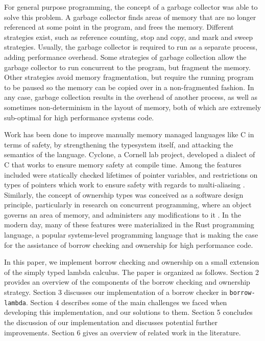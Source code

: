 \documentclass[letterpaper,11pt]{article}
\begin{document}
For general purpose programming, the concept of a garbage collector was able to solve
this problem. A garbage collector finds areas of memory that are no longer referenced
at some point in the program, and frees the memory. Different strategies exist, such
as reference counting, stop and copy, and mark and sweep strategies. Usually, the
garbage collector is required to run as a separate process, adding performance
overhead. Some strategies of garbage collection allow the garbage collector to run
concurrent to the program, but fragment the memory. Other strategies avoid memory
fragmentation, but require the running program to be paused so the memory can be
copied over in a non-fragmented fashion. In any case, garbage collection results
in the overhead of another process, as well as sometimes non-determinism in the layout
of memory, both of which are extremely sub-optimal for high performance systems code.

Work has been done to improve manually memory managed languages like C in terms of
safety, by strengthening the typesystem itself, and attacking the semantics of the
language. Cyclone, a Cornell lab project, developed a dialect of C that works to
ensure memory safety at compile time. Among the features included were statically
checked lifetimes of pointer variables, and restrictions on types of pointers which
work to ensure safety with regards to multi-aliasing \cite{grossman2002region}. Similarly, the
concept of ownership types was conceived as a software design principle, particularly
in research on concurrent programming, where an object governs an area of memory,
and administers any modifications to it \cite{boyapati2002ownership} \cite{gordon2012uniqueness}. In the modern day,
many of these features were materialized in the Rust programming language, a popular
systems-level programming language that is making the case for the assistance of
borrow checking and ownership for high performance code.

In this paper, we implement borrow checking and ownership on a small extension of the
simply typed lambda calculus. The paper is organized as follows. Section 2 provides an
overview of the components of the borrow checking and ownership strategy. Section 3
discusses our implementation of a borrow checker in \texttt{borrow-lambda}.
Section 4 describes some of the main challenges we faced when developing this
implementation, and our solutions to them. Section 5 concludes the discussion
of our implementation and discusses potential further improvements. Section 6
gives an overview of related work in the literature.
\end{document}
